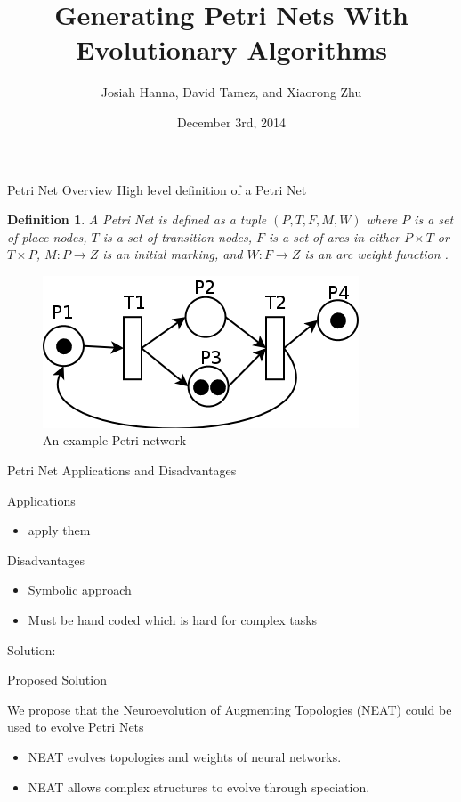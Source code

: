 \documentclass[12pt]{beamer}
\author{Josiah Hanna, David Tamez, and Xiaorong Zhu}
\title{Generating Petri Nets With Evolutionary Algorithms}
\institute{The University of Texas at Austin}
\date{December 3rd, 2014}
\newtheorem{myDef}{Definition}
\begin{document}
\begin{frame}
\titlepage
\end{frame}

\begin{frame}{Petri Net Overview}
High level definition of a Petri Net
\begin{myDef}
A Petri Net is defined as a tuple $(P,T,F,M,W)$ where $P$ is a set of place nodes, $T$ is a set of transition nodes, $F$ is a set of arcs in either $P \times T$ or $T \times P$, $M: P \rightarrow Z$ is an initial marking, and $W: F \rightarrow Z$ is an arc weight function \cite{PNP}.
\end{myDef}
\begin{figure}
\includegraphics[scale=0.25]{petri_net.png}
\caption[]{An example Petri network \label{exampleNet}}
\end{figure}
\end{frame}

\begin{frame}{Petri Net Applications and Disadvantages}

Applications
\begin{itemize}
\item apply them
\end{itemize}
Disadvantages
\begin{itemize}
\item Symbolic approach
\item Must be hand coded which is hard for complex tasks
\end{itemize}

Solution: 


\end{frame}

\begin{frame}{Proposed Solution}

We propose that the Neuroevolution of Augmenting Topologies (NEAT) could be used to evolve Petri Nets

\begin{itemize}
\item NEAT evolves topologies and weights of neural networks.
\item NEAT allows complex structures to evolve through speciation.
\end{itemize}

\end{frame}
\end{document}
